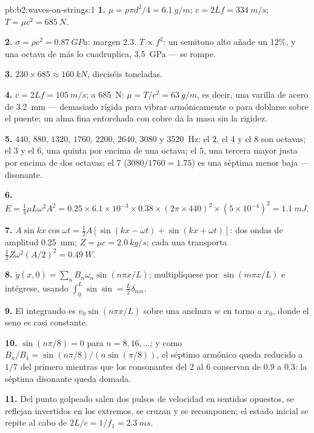 \begin{solution}{pb:b2:waves-on-strings:1}
\textbf{1.} $\mu = \rho\pi d^2/4 = \qty{6.1}{g/m}$; $c = 2Lf = \qty{334}{m/s}$; $T = \mu c^2
= \qty{685}{N}$.

\textbf{2.} $\sigma = \rho c^2 = \qty{0.87}{GPa}$: margen $2.3$. $T \propto f^2$: un
semitono alto añade un $12\%$, y una octava de más lo cuadruplica,
\qty{3.5}{GPa} --- se rompe.

\textbf{3.} $230 \times 685 \approx \qty{160}{kN}$, dieciséis toneladas.

\textbf{4.} $c = 2Lf = \qty{105}{m/s}$; a \qty{685}{N}: $\mu = T/c^2 = \qty{63}{g/m}$,
es decir, una varilla de acero de \qty{3.2}{mm} --- demasiado rígida para
vibrar armónicamente o para doblarse sobre el puente; un alma fina
entorchada con cobre da la masa sin la rigidez.

\textbf{5.} $440$, $880$, $1320$, $1760$, $2200$, $2640$, $3080$ y \qty{3520}{Hz}: el $2$,
el $4$ y el $8$ son octavas; el $3$ y el $6$, una quinta por encima de una
octava; el $5$, una tercera mayor justa por encima de dos octavas; el $7$
($3080/1760 = 1.75$) es una séptima menor baja --- disonante.

\textbf{6.} $E = \tfrac14\mu L\omega^2A^2 = 0.25 \times 6.1 \times 10^{-3} \times 0.38 \times (2\pi
\times 440)^2 \times (5 \times 10^{-4})^2 = \qty{1.1}{mJ}$.

\textbf{7.} $A\sin kx\cos\omega t = \tfrac12A[\sin(kx - \omega t) + \sin(kx + \omega t)]$: dos
ondas de amplitud \qty{0.25}{mm}; $Z = \mu c = \qty{2.0}{kg/s}$; cada una transporta
$\tfrac12Z\omega^2(A/2)^2 = \qty{0.49}{W}$.

\textbf{8.} $\dot y(x, 0) = \sum_nB_n\omega_n\sin(n\pi x/L)$; multiplíquese por
$\sin(m\pi x/L)$ e intégrese, usando $\int_0^L\sin\sin = \tfrac L2\delta_{mn}$.

\textbf{9.} El integrando es $v_0\sin(n\pi x/L)$ sobre una anchura $w$ en torno a $x_0$,
donde el seno es casi constante.

\textbf{10.} $\sin(n\pi/8) = 0$ para $n = 8, 16, \dots$; y como $B_n/B_1 =
\sin(n\pi/8)/(n\sin(\pi/8))$, el séptimo armónico queda reducido a $1/7$ del
primero mientras que los consonantes del $2$ al $6$ conservan de $0.9$ a $0.3$:
la séptima disonante queda domada.

\textbf{11.} Del punto golpeado salen dos pulsos de velocidad en sentidos
opuestos, se reflejan invertidos en los extremos, se cruzan y se
recomponen; el estado inicial se repite al cabo de $2L/c = 1/f_1 = \qty{2.3}{ms}$.


\end{solution}
